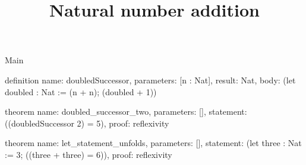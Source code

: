 \begin{lexlean}{Main}
\title{Natural number addition}
\begin{semanticmodule}
definition{
  name: doubledSuccessor,
  parameters: [n : Nat],
  result: Nat,
  body: (let doubled : Nat := (n + n); (doubled + 1))
}

theorem{
  name: doubled_successor_two,
  parameters: [],
  statement: ((doubledSuccessor 2) = 5),
  proof: reflexivity{}
}

theorem{
  name: let_statement_unfolds,
  parameters: [],
  statement: (let three : Nat := 3; ((three + three) = 6)),
  proof: reflexivity{}
}
\end{semanticmodule}
\end{lexlean}
